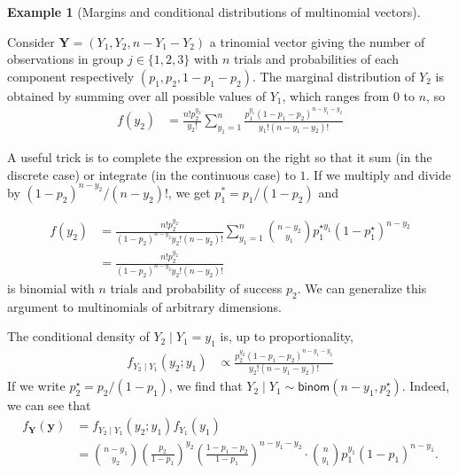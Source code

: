 \documentclass[
  11pt,
  letterpaper,
]{scrbook}
\theoremstyle{definition}
\theoremstyle{definition}
\newtheorem{example}{Example}[chapter]
\theoremstyle{definition}
\theoremstyle{plain}
\theoremstyle{plain}
\theoremstyle{remark}
\begin{document}
\begin{example}[Margins and conditional distributions of multinomial
vectors]\protect\hypertarget{exm-marginal-multinom}{}\label{exm-marginal-multinom}

Consider \(\boldsymbol{Y} = (Y_1, Y_2, n-Y_1-Y_2)\) a trinomial vector
giving the number of observations in group \(j \in \{1,2,3\}\) with
\(n\) trials and probabilities of each component respectively
\((p_1, p_2, 1-p_1-p_2)\). The marginal distribution of \(Y_2\) is
obtained by summing over all possible values of \(Y_1\), which ranges
from \(0\) to \(n\), so \begin{align*}
f(y_2) &= \frac{n!p_2^{y_2}}{y_2!}\sum_{y_1=1}^n \frac{p_1^{y_1}(1-p_1 -p_2)^{n-y_1-y_2}}{y_1!(n-y_1-y_2)!}
\end{align*}

A useful trick is to complete the expression on the right so that it sum
(in the discrete case) or integrate (in the continuous case) to \(1.\)
If we multiply and divide by \((1-p_2)^{n-y_2} /(n-y_2)!\), we get
\(p_1^*=p_1/(1-p_2)\) and

\begin{align*}
f(y_2) &= \frac{n!p_2^{y_2}}{(1-p_2)^{n-y_2} y_2!(n-y_2)!}\sum_{y_1=1}^n \binom{n-y_2}{y_1} p_1^{\star y_1}(1-p^{\star}_1)^{n-y_2}
\\&= \frac{n!p_2^{y_2}}{(1-p_2)^{n-y_2} y_2!(n-y_2)!}
\end{align*} is binomial with \(n\) trials and probability of success
\(p_2\). We can generalize this argument to multinomials of arbitrary
dimensions.

The conditional density of \(Y_2 \mid Y_1=y_1\) is, up to
proportionality, \begin{align*}
f_{Y_2 \mid Y_1}(y_2; y_1) &\propto \frac{p_2^{y_2}(1-p_1 -p_2)^{n-y_1-y_2}}{y_2!(n-y_1-y_2)!}
\end{align*} If we write \(p_2^\star=p_2/(1-p_1)\), we find that
\(Y_2 \mid Y_1 \sim \mathsf{binom}(n-y_1, p_2^\star)\). Indeed, we can
see that \begin{align*}
f_{\boldsymbol{Y}}(\boldsymbol{y}) &= f_{Y_2 \mid Y_1}(y_2; y_1) f_{Y_1}(y_1) 
\\&= \binom{n-y_1}{y_2} \left( \frac{p_2}{1-p_1}\right)^{y_2}\left(\frac{1-p_1-p_2}{1-p_1}\right)^{n-y_1-y_2}\!\!\cdot\binom{n}{y_1} p_1^{y_1}(1-p_1)^{n-y_1}.
\end{align*}

\end{example}
\end{document}
